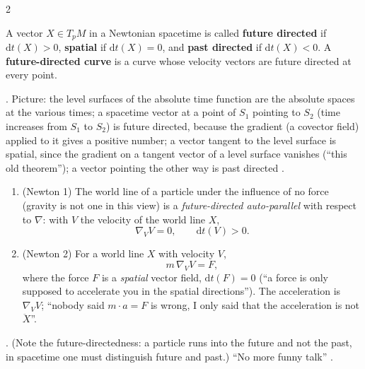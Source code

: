 \begin{paracol}{2}
\begin{definition}\label{def:c09-fut}
A vector $X\in T_pM$ in a Newtonian spacetime is called \textbf{future directed} if $\mathrm dt(X)>0$, \textbf{spatial} if $\mathrm dt(X)=0$, and \textbf{past directed} if $\mathrm dt(X)<0$. A \textbf{future-directed curve} is a curve whose velocity vectors are future directed at every point.
\end{definition}
.
Picture: the level surfaces of the absolute time function are the absolute spaces at the various times; a spacetime vector at a point of $S_1$ pointing to $S_2$ (time increases from $S_1$ to $S_2$) is future directed, because the gradient (a covector field) applied to it gives a positive number; a vector tangent to the level surface is spatial, since the gradient on a tangent vector of a level surface vanishes (``this old theorem''); a vector pointing the other way is past directed .

\begin{definition}\label{def:c09-newtongeom}
\begin{enumerate}
  \item (Newton 1) The world line of a particle under the influence of no force (gravity is not one in this view) is a \emph{future-directed auto-parallel} with respect to $\nabla$: with $V$ the velocity of the world line $X$,
        \[
          \nabla_VV=0,\qquad\mathrm dt(V)>0.
        \]
  \item (Newton 2) For a world line $X$ with velocity $V$,
        \[
          m\,\nabla_VV=F,
        \]
        where the force $F$ is a \emph{spatial} vector field, $\mathrm dt(F)=0$ (``a force is only supposed to accelerate you in the spatial directions''). The acceleration is $\nabla_VV$; ``nobody said $m\cdot a=F$ is wrong, I only said that the acceleration is not $\ddot X$''.
\end{enumerate}
\end{definition}
.
(Note the future-directedness: a particle runs into the future and not the past, in spacetime one must distinguish future and past.) ``No more funny talk''
.


\end{paracol}
